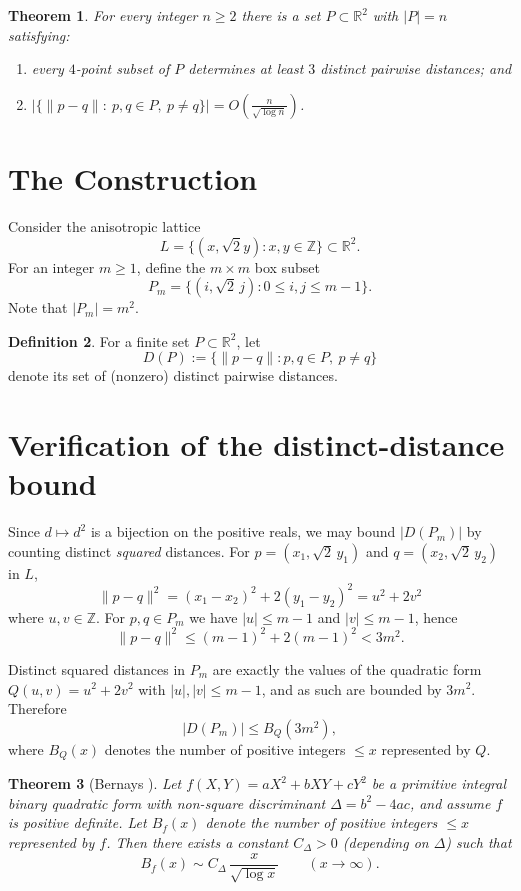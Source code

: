 \documentclass[11pt, reqno]{amsart}
\newtheorem{theorem}{Theorem}
\theoremstyle{definition}
\newtheorem{definition}[theorem]{Definition}
\theoremstyle{remark}
\newcommand{\R}{\mathbb{R}}
\newcommand{\Z}{\mathbb{Z}}
\begin{document}
\begin{theorem}\label{thm:main}
For every integer $n\ge 2$ there is a set $P\subset \R^2$ with $|P|=n$ satisfying:
\begin{enumerate}[label=(\roman*)]
\item every $4$-point subset of $P$ determines at least $3$ distinct pairwise distances; and
\item $\bigl|\{\|p-q\|:\ p,q\in P,\ p\neq q\}\bigr| = O\!\left(\frac{n}{\sqrt{\log n}}\right)$.
\end{enumerate}
\end{theorem}
 

\section{The Construction}

Consider the anisotropic lattice
\[
L = \{(x,\sqrt{2}y):x,y \in \Z\} \subset \R^2.
\]
For an integer $m\ge 1$, define the $m\times m$ box subset 
\[
P_m=\{(i,\sqrt2\,j): 0\le i,j\le m-1\}.
\]
Note that $|P_m|=m^2$.

\begin{definition}
For a finite set $P\subset\R^2$, let
\[
D(P) := \{\|p-q\| : p,q\in P,\ p\neq q\}
\]
denote its set of (nonzero) distinct pairwise distances.
\end{definition}
\section{Verification of the distinct-distance bound}\label{sec:distinct-dist}

Since $d\mapsto d^2$ is a bijection on the positive reals, we may bound $|D(P_m)|$ by counting distinct \emph{squared} distances. For $p=(x_1,\sqrt2\,y_1)$ and
$q=(x_2,\sqrt2\,y_2)$ in $L$,
\[
\|p-q\|^2=(x_1-x_2)^2+2(y_1-y_2)^2 = u^2+2v^2
\]
where $u,v\in\Z$. For $p,q\in P_m$ we have $|u|\le m-1$ and $|v|\le m-1$, hence
\[
\|p-q\|^2 \le (m-1)^2+2(m-1)^2 < 3m^2.
\]

Distinct squared distances in $P_m$ are exactly the values of the quadratic form
$Q(u,v)=u^2+2v^2$ with $|u|,|v|\le m-1$, and as such are bounded by $3m^2$. Therefore
\[
|D(P_m)| \le B_Q(3m^2),
\]
where $B_Q(x)$ denotes the number of positive integers $\le x$ represented by $Q$.

\begin{theorem}[Bernays {\cite[Eq.~(2)]{brinkmoreeosburn2011}}]\label{thm:bernays}
Let $f(X,Y)=aX^2+bXY+cY^2$ be a primitive integral binary quadratic form with non-square
discriminant $\Delta=b^2-4ac$, and assume $f$ is positive definite. Let $B_f(x)$ denote
the number of positive integers $\le x$ represented by $f$. Then there exists a constant $C_\Delta>0$
(depending on $\Delta$) such that
\[
B_f(x)\sim C_\Delta\,\frac{x}{\sqrt{\log x}}
\qquad (x\to\infty).
\]
\end{theorem}
\end{document}
